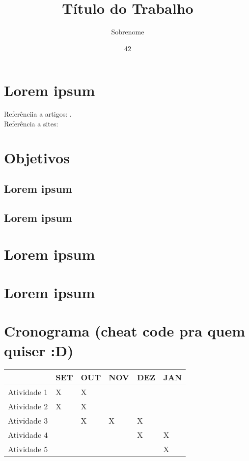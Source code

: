 \documentclass[projtg]{mdtufsm}
\title{Título do Trabalho}
\author{Sobrenome}{Nome}
\institute{Centro de Tecnologia}
\date{42}{Trezembro}{2013}
\begin{document}
\maketitle
\setlength{\baselineskip}{1.5\baselineskip}

\chapter{Lorem ipsum}
Referênciia a artigos: \cite{artigo2013sobrenome}. \\
Referência a sites: \cite{siteref2013}
\lipsum[1]
    
\chapter{Objetivos}
\lipsum[1]

\section{Lorem ipsum}
\lipsum[1]
	
\section{Lorem ipsum}
\lipsum[1]

\chapter{Lorem ipsum}
\lipsum[1]

\chapter{Lorem ipsum}
\lipsum[1]
    
\chapter{Cronograma (cheat code pra quem quiser :D)}
\begin{tabu} to 0.9\linewidth{|X[6]|X|X|X|X|X|}
	\hline
	& SET & OUT & NOV & DEZ & JAN \\
	\hline
	Atividade 1 & X & X & & & \\
	\hline
	Atividade 2 & X & X & & & \\
	\hline
	Atividade 3 & & X & X & X & \\
	\hline
	Atividade 4 & & & & X & X \\
	\hline
	Atividade 5 & & & & & X \\
	\hline
\end{tabu}
 
\setlength{\baselineskip}{\baselineskip}



\end{document}
